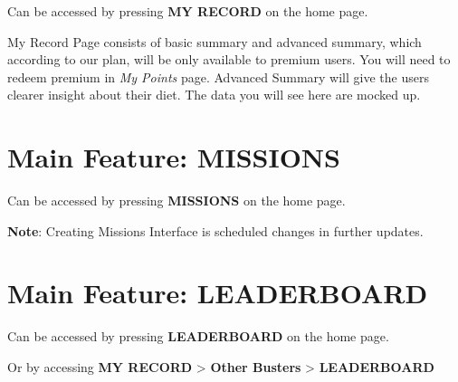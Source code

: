 \documentclass[a4paper,12pt]{article}
\begin{document}
Can be accessed by pressing \textbf{MY RECORD} on the home page.


My Record Page consists of basic summary and advanced summary, which according
to our plan, will be only available to premium users. You will need to
redeem premium in \textit{My Points} page.
Advanced Summary will give the users clearer insight about their diet.
The data you will see here are mocked up.

\pagebreak
\section{Main Feature: MISSIONS}

Can be accessed by pressing \textbf{MISSIONS} on the home page.


\textbf{Note}: Creating Missions Interface is scheduled changes in further updates.

\pagebreak
\section{Main Feature: LEADERBOARD}

Can be accessed by pressing \textbf{LEADERBOARD} on the home page.

\noindent
Or by accessing \textbf{MY RECORD} > \textbf{Other Busters} > \textbf{LEADERBOARD}

\end{document}
